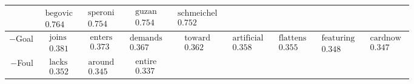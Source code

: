 \documentclass{beamer}
\begin{document}
\begin{frame}
\begin{tabular}{r|c c c c c c c c}
 & $\begin{matrix}\text{begovic}\\0.764\end{matrix}$
 & $\begin{matrix}\text{speroni}\\0.754\end{matrix}$
 & $\begin{matrix}\text{guzan}\\0.754\end{matrix}$
 & $\begin{matrix}\text{schmeichel}\\0.752\end{matrix}$
 \\\hline
 $-$Goal
& $ \begin{matrix} \text{joins} \\ 0.381 \end{matrix}$
& $ \begin{matrix} \text{enters} \\ 0.373 \end{matrix}$
& $ \begin{matrix} \text{demands} \\ 0.367 \end{matrix}$
& $ \begin{matrix} \text{toward} \\ 0.362 \end{matrix}$
& $ \begin{matrix} \text{artificial} \\ 0.358 \end{matrix}$
& $ \begin{matrix} \text{flattens} \\ 0.355 \end{matrix}$
& $ \begin{matrix} \text{featuring} \\ 0.348 \end{matrix}$
& $ \begin{matrix} \text{cardnow} \\ 0.347 \end{matrix}$
\\\hline
$-$Foul
& $ \begin{matrix} \text{lacks} \\ 0.352 \end{matrix}$
& $ \begin{matrix} \text{around} \\ 0.345 \end{matrix}$
& $ \begin{matrix} \text{entire} \\ 0.337 \end{matrix}$

\end{tabular}
\end{frame}
\end{document}
